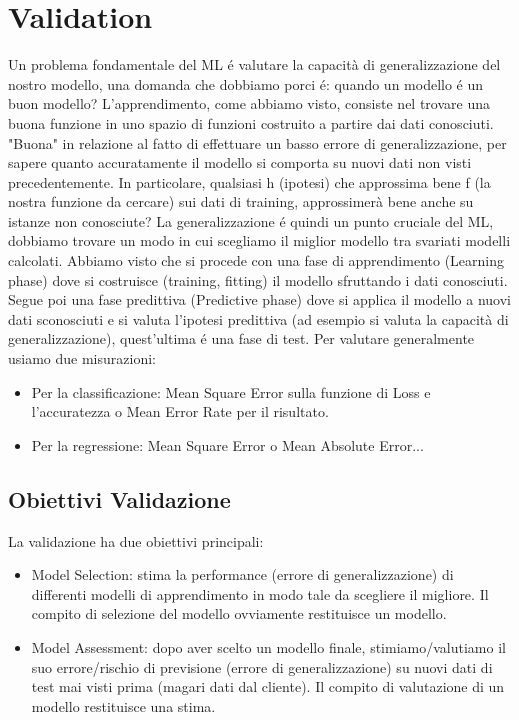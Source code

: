\documentclass{article}
\begin{document}
\section{Validation}
Un problema fondamentale del ML é valutare la capacità di generalizzazione del nostro modello, una domanda che dobbiamo porci é: quando un modello é un buon modello? L'apprendimento, come abbiamo visto, consiste nel trovare una buona funzione in uno spazio di funzioni costruito a partire dai dati conosciuti. "Buona" in relazione al fatto di effettuare un basso errore di generalizzazione, per sapere quanto accuratamente il modello si comporta su nuovi dati non visti precedentemente. \newline 
In particolare, qualsiasi h (ipotesi) che approssima bene f (la nostra funzione da cercare) sui dati di training, approssimerà bene anche su istanze non conosciute? La generalizzazione é quindi un punto cruciale del ML, dobbiamo trovare un modo in cui scegliamo il miglior modello tra svariati modelli calcolati.
Abbiamo visto che si procede con una fase di apprendimento (Learning phase) dove si costruisce (training, fitting) il modello sfruttando i dati conosciuti. Segue poi una fase predittiva (Predictive phase) dove si applica il modello a nuovi dati sconosciuti e si valuta l'ipotesi predittiva (ad esempio si valuta la capacità di generalizzazione), quest'ultima é una fase di test. \newline
Per valutare generalmente usiamo due misurazioni:
\begin{itemize}
    \item Per la classificazione: Mean Square Error sulla funzione di Loss e l'accuratezza o Mean Error Rate per il risultato.
    \item Per la regressione: Mean Square Error o Mean Absolute Error...
\end{itemize}

\subsection{Obiettivi Validazione}
La validazione ha due obiettivi principali:
\begin{itemize}
    \item Model Selection: stima la performance (errore di generalizzazione) di differenti modelli di apprendimento in modo tale da scegliere il migliore. Il compito di selezione del modello ovviamente restituisce un modello.
    \item Model Assessment: dopo aver scelto un modello finale, stimiamo/valutiamo il suo errore/rischio di previsione (errore di generalizzazione) su nuovi dati di test mai visti prima (magari dati dal cliente). Il compito di valutazione di un modello restituisce una stima.
\end{itemize}
\end{document}
